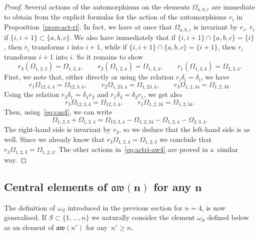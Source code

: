 \documentclass[pdftex]{sigma}
\numberwithin{equation}{section}
\theoremstyle{definition}
\newcommand{\rb}{\overline{r}}
\begin{document}
\begin{proof}
Several actions of the automorphisms on the elements $\varOmega_{a,b,c}$ are immediate to obtain from the explicit formulas for the action of the automorphisms $r_i$ in Proposition~\ref{prop-act-ri}. In fact, we have at once that $\varOmega_{a,b,c}$ is invariant by $r_i$, $\rb_i$ if $\{i,i+1\}\subset\{a,b,c\}$. We also have immediately that if $\{i,i+1\}\cap\{a,b,c\}=\{i\}$, then $\rb_i$ transforms $i$ into $i+1$, while if $\{i,i+1\}\cap\{a,b,c\}=\{i+1\}$, then $r_i$ transforms $i+1$ into $i$. So it remains to show
\begin{equation}\label{eq:actri-aw4}
r_3(\varOmega_{1,2,3})=\varOmega_{1,2,4} ,\qquad r_2(\varOmega_{1,2,4})=\varOmega_{1,3,4} ,\qquad r_1(\varOmega_{1,3,4})=\varOmega_{2,3,4} .
\end{equation}
First, we note that, either directly or using the relation $r_i\delta_i=\delta_i$, we have
\[r_1\varOmega_{12,3,4}=\varOmega_{12,3,4} ,\qquad r_2\varOmega_{1,23,4}=\varOmega_{1,23,4} ,\qquad r_3\varOmega_{1,2,34}=\varOmega_{1,2,34} .\]
Using the relation $r_3\delta_1=\delta_1r_2$ and $r_1\delta_3=\delta_3r_1$, we get also
\[r_3\varOmega_{12,3,4}=\varOmega_{12,3,4} ,\qquad r_1\varOmega_{1,2,34}=\varOmega_{1,2,34} .\]
Then, using~\eqref{eq:cas4}, we can write
\[\varOmega_{1,2,3}+\varOmega_{1,2,4}=\varOmega_{12,3,4}-\varOmega_{1,2,34}-\varOmega_{1,3,4}-\varOmega_{2,3,4} .\]
The right-hand side is invariant by $r_3$, so we deduce that the left-hand side is as well. Since we already know that $r_3\varOmega_{1,2,4}=\varOmega_{1,2,3}$ we conclude that $r_3\varOmega_{1,2,3}=\varOmega_{1,2,4}$. The other actions in~\eqref{eq:actri-aw4} are proved in a~similar way.
\end{proof}

\subsection[Central elements of aw(n) for any n]{Central elements of $\boldsymbol{\mathfrak{aw}(n)}$ for any $\boldsymbol{n}$}
The definition of $\omega_S$ introduced in the previous section for $n=4$, is now generalised. If ${S\subset\{1,\dots,n\}}$ we naturally consider the element $\omega_S$ defined below as an element of $\mathfrak{aw}(n')$ for any~$n'\geq n$.
\end{document}
